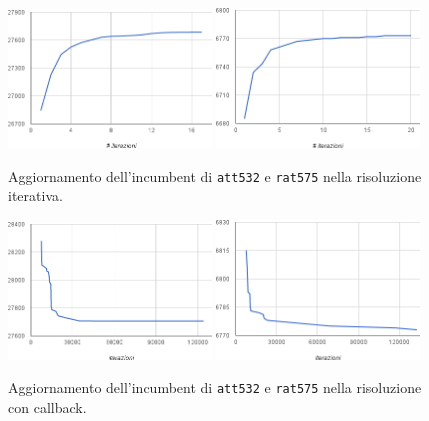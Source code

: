 \begin{figure}
  \begin{center}
    \includegraphics[width=0.48\textwidth]{images/att532iteragg}
    \includegraphics[width=0.48\textwidth]{images/rat575iteragg}
    \caption{Aggiornamento dell'incumbent di \texttt{att532} e \texttt{rat575} nella risoluzione iterativa.}
    \label{fig:updatingincumbentiter}

    \includegraphics[width=0.48\textwidth]{images/att532aggiornamento}
    \includegraphics[width=0.48\textwidth]{images/rat575aggiornamento}
    \caption{Aggiornamento dell'incumbent di \texttt{att532} e \texttt{rat575} nella risoluzione con callback.}
    \label{fig:updatingincumbent}
  \end{center}
\end{figure}

